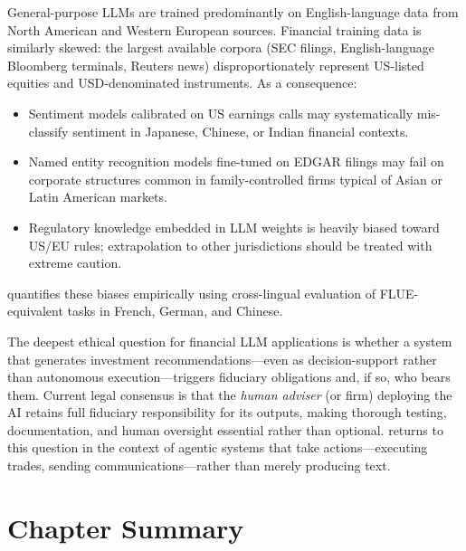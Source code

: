 \begin{context}
General-purpose LLMs are trained predominantly on English-language data from North
American and Western European sources.  Financial training data is similarly skewed:
the largest available corpora (SEC filings, English-language Bloomberg terminals,
Reuters news) disproportionately represent US-listed equities and USD-denominated
instruments.  As a consequence:
\begin{itemize}
  \item Sentiment models calibrated on US earnings calls may systematically
    mis-classify sentiment in Japanese, Chinese, or Indian financial contexts.
  \item Named entity recognition models fine-tuned on EDGAR filings may fail on
    corporate structures common in family-controlled firms typical of Asian or Latin
    American markets.
  \item Regulatory knowledge embedded in LLM weights is heavily biased toward US/EU
    rules; extrapolation to other jurisdictions should be treated with extreme caution.
\end{itemize}
 quantifies these biases empirically using cross-lingual evaluation of
FLUE-equivalent tasks in French, German, and Chinese.

The deepest ethical question for financial LLM applications is whether a system that
generates investment recommendations---even as decision-support rather than autonomous
execution---triggers fiduciary obligations and, if so, who bears them.  Current legal
consensus is that the \emph{human adviser} (or firm) deploying the AI retains full
fiduciary responsibility for its outputs, making thorough testing, documentation, and
human oversight essential rather than optional.   returns to this question in the
context of agentic systems that take actions---executing trades, sending
communications---rather than merely producing text.

\end{context}

\section{Chapter Summary}
\label{sec:ch2-summary}

